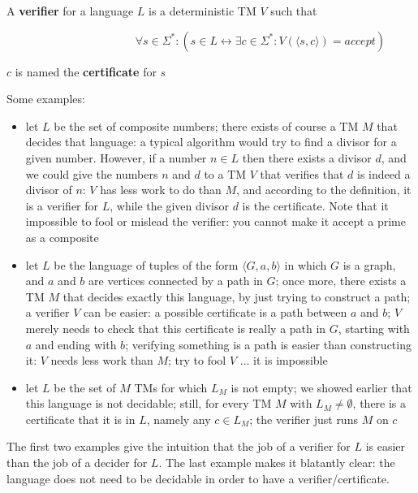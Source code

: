 \begin{definition} \label{verifiercertificate}
A {\bf verifier} for a language $L$ is a deterministic TM $V$
such that

~~~~~~~~~~~~~~~~~~~~~~
$\forall s \in \Sigma^* : (s \in L \leftrightarrow \exists c \in \Sigma^*: V(\langle s,c \rangle) = accept)$


$c$ is named the {\bf certificate} for $s$
\end{definition}

Some examples:
\begin{itemize}
\item
let $L$ be the set of composite numbers; there exists of course a TM
$M$ that decides that language: a typical algorithm would try to find
a divisor for a given number. However, if a number $n \in L$ then
there exists a divisor $d$, and we could give the numbers $n$ and $d$
to a TM $V$ that verifies that $d$ is indeed a divisor of $n$: $V$
has less work to do than $M$, and according to the definition, it is a
verifier for $L$, while the given divisor $d$ is the certificate. Note
that it impossible to fool or mislead the verifier: you cannot make it
accept a prime as a composite

\item
let $L$ be the language of tuples of the form $\langle G,a,b \rangle$
in which $G$ is a graph, and $a$ and $b$ are vertices connected by a
path in $G$; once more, there exists a TM $M$ that decides exactly
this language, by just trying to construct a path; a verifier $V$ can
be easier: a possible certificate is a path between $a$ and $b$; $V$
merely needs to check that this certificate is really a path in $G$,
starting with $a$ and ending with $b$; verifying something is a path
is easier than constructing it: $V$ needs less work than $M$; try to
fool $V$ ... it is impossible

\item
let $L$ be the set of $M$ TMs for which $L_M$ is not empty; we showed
earlier that this language is not decidable; still, for every TM $M$
with $L_M \neq \emptyset$, there is a certificate that it is in $L$,
namely any $c \in L_M$; the verifier just runs $M$ on $c$

\end{itemize}

The first two examples give the intuition that the job of a verifier
for $L$ is easier than the job of a decider for $L$. The last example
makes it blatantly clear: the language does not need to be decidable
in order to have a verifier/certificate.

